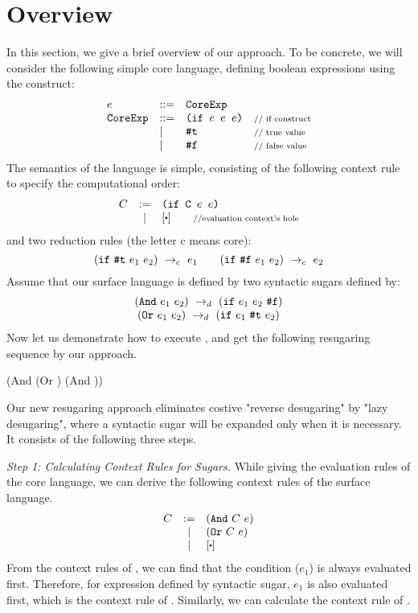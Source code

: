 \section{Overview}
\label{sec2}


In this section, we give a brief overview of our approach. To be concrete, we will consider the following simple core language, defining boolean expressions using the  construct:
\[
\begin{array}{lllll}
e &::=& \mbox{\tt CoreExp}\\
\mbox{\tt CoreExp} &::=& \texttt{(if~$e$~$e$~$e$)} &\mbox{{\scriptsize // if construct}}\\
& |& \mbox{\tt \#t}  & \mbox{{\scriptsize // true value}}\\
& |& \mbox{\tt \#f} & \mbox{{\scriptsize // false value}}
\end{array}
\]
The semantics of the language is simple, consisting of the following context rule to specify the computational order:
\[
\begin{array}{lcl}
C &:=& \Code{(if C $e$ $e$)}\\
&|&[\bigcdot] \qquad \note{//evaluation context's hole}\\
\end{array}
\]
and two reduction rules (the letter c means core):
\[
\centering
 \redc{(\m{if}~\m{\true}~e_1~e_2)}{e_1}  \qquad \redc{(\m{if}~\m{\false}~e_1~e_2)}{e_2}
\]
Assume that our surface language is defined by two syntactic sugars defined by:
\[
\begin{array}{c}
(\mbox{\tt And}~e_1~e_2) ~\rightarrow_d~ (\mbox{\tt if}~e_1~e_2~\mbox{\tt \#f})\\
(\mbox{\tt Or}~e_1~e_2) ~\rightarrow_d~ (\mbox{\tt if}~e_1~\mbox{\tt \#t}~e_2)
\end{array}
\]
Now let us demonstrate how to execute , and get the following resugaring sequence by our approach.
{\small
\begin{Codes}
    (And (Or \true \false) (And \false \true))
\end{Codes}
}

Our new resugaring approach eliminates costive "reverse desugaring" by "lazy desugaring", where a syntactic sugar will be expanded only when it is necessary. It consists of the following three steps.

{\em Step 1: Calculating Context Rules for Sugars.}
While giving the evaluation rules of the core language, we can derive the following context rules of the surface language.
\[
\begin{array}{lcl}
C &:=& (\m{And}~C~e)\\
&|& (\m{Or}~C~e)\\
&|&[\bigcdot]\\
\end{array}
\]
From the context rules of , we can find that the condition ($e_1$) is always evaluated first. Therefore, for expression  defined by syntactic sugar, $e_1$ is also evaluated first, which is the context rule of . Similarly, we can calculate the context rule of .

